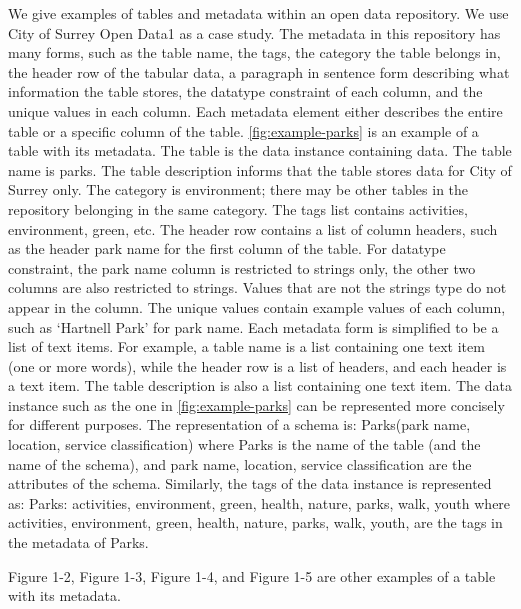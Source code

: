We give examples of tables and metadata within an open data repository. We use City of Surrey Open Data1 as a case study. The metadata in this repository has many forms, such as the table name, the tags, the category the table belongs in, the header row of the tabular data, a paragraph in sentence form describing what information the table stores, the datatype constraint of each column, and the unique values in each column. Each metadata element either describes the entire table or a specific column of the table. \autoref{fig:example-parks} is an example of a table with its metadata. The table is the data instance containing data. The table name is parks. The table description informs that the table stores data for City of Surrey only. The category is environment; there may be other tables in the repository belonging in the same category. The tags list contains activities, environment, green, etc. The header row contains a list of column headers, such as the header park name for the first column of the table. For datatype constraint, the park name column is restricted to strings only, the other two columns are also restricted to strings. Values that are not the strings type do not appear in the column. The unique values contain example values of each column, such as ‘Hartnell Park’ for park name.
Each metadata form is simplified to be a list of text items. For example, a table name is a list containing one text item (one or more words), while the header row is a list of headers, and each header is a text item. The table description is also a list containing one text item.
The data instance such as the one in \autoref{fig:example-parks} can be represented more concisely for different purposes. The representation of a schema is:
Parks(park name, location, service classification)
where Parks is the name of the table (and the name of the schema), and park name, location, service classification are the attributes of the schema.
Similarly, the tags of the data instance is represented as:
Parks: {activities, environment, green, health, nature, parks, walk, youth}
where activities, environment, green, health, nature, parks, walk, youth, are the tags in the metadata of Parks.

Figure 1-2, Figure 1-3, Figure 1-4, and Figure 1-5 are other examples of a table with its metadata.

